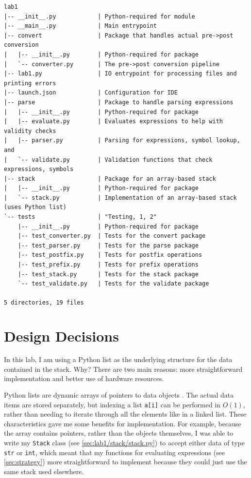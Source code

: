 \documentclass[10pt,letterpaper,final]{report}
\begin{document}
\begin{verbatim}
lab1
|-- __init__.py            | Python-required for module
|-- __main__.py            | Main entrypoint
|-- convert                | Package that handles actual pre->post conversion
|   |-- __init__.py        | Python-required for package
|   `-- converter.py       | The pre->post conversion pipeline
|-- lab1.py                | IO entrypoint for processing files and printing errors
|-- launch.json            | Configuration for IDE
|-- parse                  | Package to handle parsing expressions
|   |-- __init__.py        | Python-required for package
|   |-- evaluate.py        | Evaluates expressions to help with validity checks
|   |-- parser.py          | Parsing for expressions, symbol lookup, and 
|   `-- validate.py        | Validation functions that check expressions, symbols
|-- stack                  | Package for an array-based stack
|   |-- __init__.py        | Python-required for package
|   `-- stack.py           | Implementation of an array-based stack (uses Python list)
`-- tests                  | "Testing, 1, 2"
    |-- __init__.py        | Python-required for package
    |-- test_converter.py  | Tests for the convert package
    |-- test_parser.py     | Tests for the parse package
    |-- test_postfix.py    | Tests for postfix operations
    |-- test_prefix.py     | Tests for prefix operations
    |-- test_stack.py      | Tests for the stack package
    `-- test_validate.py   | Tests for the validate package

5 directories, 19 files
\end{verbatim}

\section{Design Decisions}

In this lab, I am using a Python list as the underlying structure for the data contained in the stack. Why? There are two main reasons: more straightforward implementation and better use of hardware resources.

Python lists are dynamic arrays of pointers to data objects \cite{PythonDocumentationDesignAndHistory}. The actual data items are stored separately, but indexing a list \texttt{a[i]} can be performed in $O(1)$, rather than needing to iterate through all the elements like in a linked list. These characteristics gave me some benefits for implementation. For example, because the array contains pointers, rather than the objects themselves, I was able to write my \texttt{Stack} class (see \autoref{sec:lab1/stack/stack.py}) to accept either data of type \texttt{str} or \texttt{int}, which meant that my functions for evaluating expressions (see \autoref{sec:strategy}) more straightforward to implement because they could just use the same stack used elsewhere.
\end{document}
